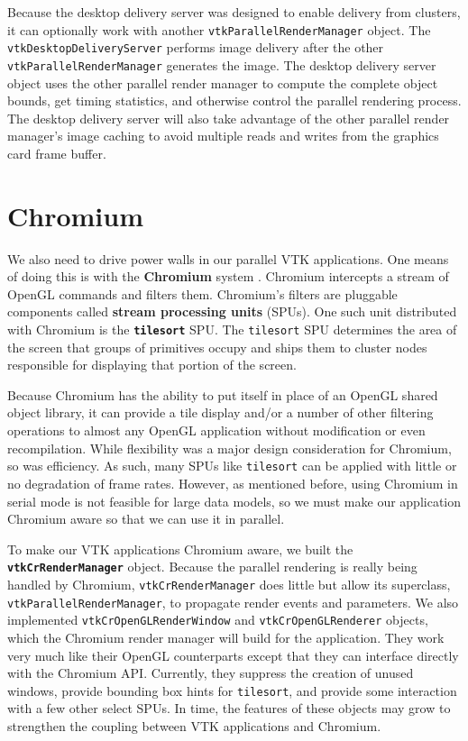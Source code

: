 \documentclass{acmsiggraph}
\newcommand{\cidentifier}[1]{\texttt{#1}}
\newcommand{\keyterm}[1]{\textbf{#1}}
\begin{document}
  Because the desktop delivery server was designed to enable delivery from
  clusters, it can optionally work with another
  \cidentifier{vtk\-Parallel\-Render\-Manager} object.  The
  \cidentifier{vtk\-Desktop\-Delivery\-Server} performs image delivery
  after the other \cidentifier{vtk\-Parallel\-Render\-Manager} generates
  the image.  The desktop delivery server object uses the other parallel
  render manager to compute the complete object bounds, get timing
  statistics, and otherwise control the parallel rendering process.  The
  desktop delivery server will also take advantage of the other parallel
  render manager's image caching to avoid multiple reads and writes from
  the graphics card frame buffer.


  \section{Chromium}
  \label{sec:chromium}

  We also need to drive power walls in our parallel VTK applications.  One
  means of doing this is with the \keyterm{Chromium} system
  \cite{Humphreys02}.  Chromium intercepts a stream of OpenGL commands and
  filters them.  Chromium's filters are pluggable components called
  \keyterm{stream processing units} (SPUs).  One such unit distributed with
  Chromium is the \keyterm{\cidentifier{tile\-sort}} SPU.  The
  \cidentifier{tile\-sort} SPU determines the area of the screen that
  groups of primitives occupy and ships them to cluster nodes responsible
  for displaying that portion of the screen.

  Because Chromium has the ability to put itself in place of an OpenGL
  shared object library, it can provide a tile display and/or a number of
  other filtering operations to almost any OpenGL application without
  modification or even recompilation.  While flexibility was a major design
  consideration for Chromium, so was efficiency.  As such, many SPUs like
  \cidentifier{tile\-sort} can be applied with little or no degradation of
  frame rates.  However, as mentioned before, using Chromium in serial mode
  is not feasible for large data models, so we must make our application
  Chromium aware so that we can use it in parallel.

  To make our VTK applications Chromium aware, we built the
  \keyterm{\cidentifier{vtk\-Cr\-Render\-Manager}} object.  Because the
  parallel rendering is really being handled by Chromium,
  \cidentifier{vtk\-Cr\-Render\-Manager} does little but allow its
  superclass, \cidentifier{vtk\-Parallel\-Render\-Manager}, to propagate
  render events and parameters.  We also implemented
  \cidentifier{vtk\-Cr\-Open\-GL\-Render\-Window} and
  \cidentifier{vtk\-Cr\-Open\-GL\-Renderer} objects, which the Chromium
  render manager will build for the application.  They work very much like
  their OpenGL counterparts except that they can interface directly with
  the Chromium API.  Currently, they suppress the creation of unused
  windows, provide bounding box hints for \cidentifier{tile\-sort}, and
  provide some interaction with a few other select SPUs.  In time, the
  features of these objects may grow to strengthen the coupling between VTK
  applications and Chromium.
\end{document}
